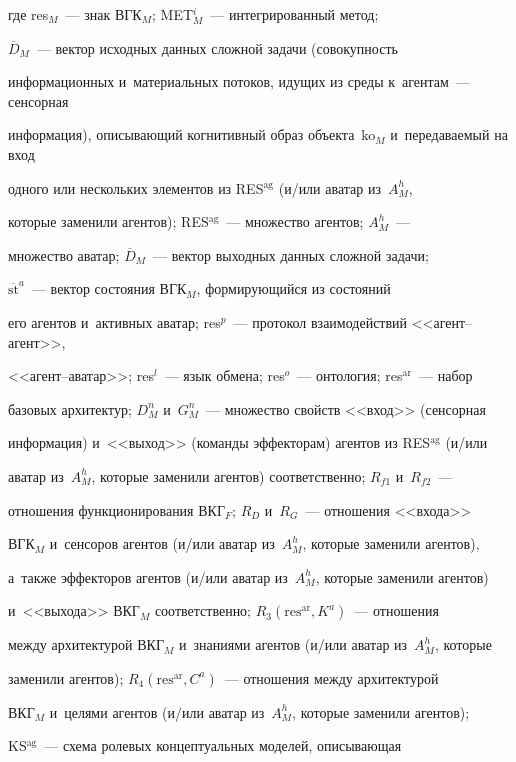 где res$_M$~--- знак ВГК$_M$; MET$^i_M$~--- интегрированный метод; 


$\overline{D}_M$~--- вектор исходных данных сложной задачи (совокупность 


информационных и~материальных потоков, идущих из среды к~агентам~--- сенсорная 


информация), описывающий когнитивный образ объекта~ko$_M$ и~передаваемый на вход 


одного или нескольких элементов из RES$^{\mathrm{ag}}$ (и/или аватар из~$A_M^h$, 


которые заменили агентов); RES$^{\mathrm{ag}}$~--- множество агентов; $A_M^h$~--- 


множество аватар; $\overline{D}_M$~--- вектор выходных данных сложной задачи; 


$\overline{\mathrm{st}}^a$~--- вектор состояния ВГК$_M$, формирующийся из состояний 


его агентов и~активных аватар; res$^p$~--- протокол взаимодействий <<агент--агент>>, 


<<агент--ава\-тар>>; res$^l$~--- язык обмена; res$^o$~--- онтология; res$^{\mathrm{ar}}$~--- набор 


базовых архитектур; $D_M^n$ и~$G_M^n$~--- множество свойств <<вход>> (сенсорная 


информация) и~<<выход>> (команды эффекторам) агентов из RES$^{\mathrm{ag}}$ (и/или 


аватар из~$A_M^h$, которые заменили агентов) соответственно; $R_{f1}$ и~$R_{f2}$~--- 


отношения функционирования ВКГ$_F$; $R_D$ и~$R_G$~--- отношения <<входа>> 


ВГК$_M$ и~сенсоров агентов (и/или аватар из~$A_M^h$, которые заменили агентов), 


а~также эффекторов агентов (и/или аватар из~$A_M^h$, которые заменили агентов) 


и~<<выхода>> ВКГ$_M$ соответственно; $R_3(\mathrm{res}^{\mathrm{ar}}, K^a)$~--- отношения 


между архитектурой ВКГ$_M$ и~знаниями агентов (и/или аватар из~$A_M^h$, которые 


заменили агентов); $R_4(\mathrm{res}^{\mathrm{ar}}, C^a)$~--- отношения между архитектурой 


ВКГ$_M$ и~целями агентов (и/или аватар из~$A_M^h$, которые заменили агентов); 


KS$^{\mathrm{ag}}$~--- схема ролевых концептуальных моделей, описывающая 


